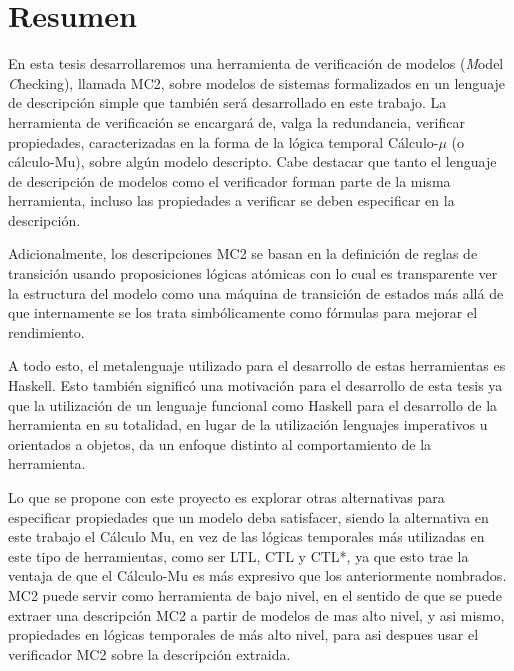 % 
% 
%
\chapter*{Resumen}

En esta tesis desarrollaremos una herramienta de verificación de modelos (\emph Model \emph Checking), llamada MC2, sobre modelos de sistemas formalizados en un lenguaje de descripción simple que también será desarrollado en este trabajo. La herramienta de verificación se encargará de, valga la redundancia, verificar propiedades, caracterizadas en la forma de la lógica temporal Cálculo-$\mu$ (o cálculo-Mu), sobre algún modelo descripto. Cabe destacar que tanto el lenguaje de descripción de modelos como el verificador forman parte de la misma herramienta, incluso las propiedades a verificar se deben especificar en la descripción.

Adicionalmente, los descripciones MC2 se basan en la definición de reglas de transición usando proposiciones lógicas atómicas con lo cual es transparente ver la estructura del modelo como una máquina de transición de estados más allá de que internamente se los trata simbólicamente como fórmulas para mejorar el rendimiento.

A todo esto, el metalenguaje utilizado para el desarrollo de estas herramientas es Haskell. Esto también significó una motivación para el desarrollo de esta tesis ya que la utilización de un lenguaje funcional como Haskell para el desarrollo de la herramienta en su totalidad, en lugar de la utilización lenguajes imperativos u orientados a objetos, da un enfoque distinto al comportamiento de la herramienta.

Lo que se propone con este proyecto es explorar otras alternativas para especificar propiedades que un modelo deba satisfacer, siendo la alternativa en este trabajo el Cálculo Mu, en vez de las lógicas temporales más utilizadas en este tipo de herramientas, como ser LTL, CTL y CTL*, ya que esto trae la ventaja de que el Cálculo-Mu es más expresivo que los anteriormente nombrados. MC2 puede servir como herramienta de bajo nivel, en el sentido de que se puede extraer una descripción MC2 a partir de modelos de mas alto nivel, y asi mismo, propiedades en lógicas temporales de más alto nivel, para asi despues usar el verificador MC2 sobre la descripción extraida.


